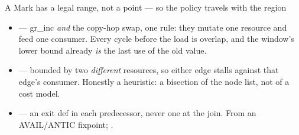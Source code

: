 \begin{frame}{A Mark has a legal range, not a point --- so the policy travels with the region}
\begin{itemize}\footnotesize
  \item {} --- gr\_inc \emph{and} the copy-hop swap, one rule: they mutate one resource and feed one consumer. Every cycle before the load is overlap, and the window's lower bound already \emph{is} the last use of the old value.
  \item {} --- bounded by two \emph{different} resources, so either edge stalls against that edge's consumer. Honestly a heuristic: a bisection of the node list, not of a cost model.
  \item {} --- an exit def in each predecessor, never one at the join. From an AVAIL/ANTIC fixpoint; .
\end{itemize}
\end{frame}
